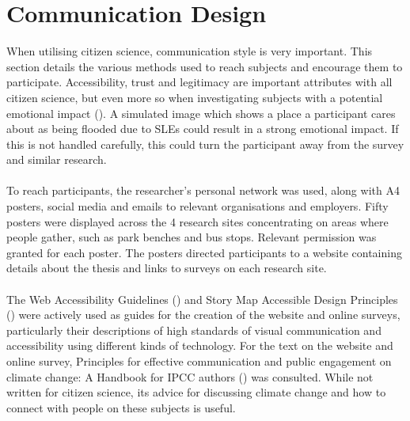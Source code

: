 \section{Communication Design} \label{com-design}

When utilising citizen science, communication style is very important. This section details the various methods used to reach subjects and encourage them to participate. Accessibility, trust and legitimacy are important attributes with all citizen science, but even more so when investigating subjects with a potential emotional impact (\cite{tweddle_guide_2012}). A simulated image which shows a place a participant cares about as being flooded due to SLEs could result in a strong emotional impact. If this is not handled carefully, this could turn the participant away from the survey and similar research.
\paragraph{}

To reach participants, the researcher's personal network was used, along with A4 posters, social media and emails to relevant organisations and employers. Fifty posters were displayed across the 4 research sites concentrating on areas where people gather, such as park benches and bus stops. Relevant permission was granted for each poster. The posters directed participants to a website containing details about the thesis and links to surveys on each research site.
\paragraph{}

The Web Accessibility Guidelines (\cite{henry_web_2022}) and Story Map Accessible Design Principles (\cite{todd_liz_getting_2020}) were actively used  as guides for the creation of the website and online surveys, particularly their descriptions of high standards of visual communication and accessibility using different kinds of technology. For the text on the website and online survey,  Principles for effective communication and public engagement on	climate change: A Handbook for IPCC authors (\cite{corner_a_principles_2018}) was consulted. While not written for citizen science, its advice for discussing climate change and how to connect with people on these subjects is useful. 
\paragraph{}

